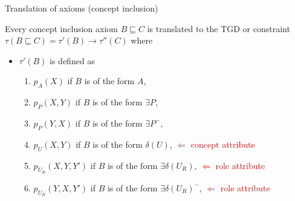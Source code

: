 \documentclass{beamer}
\begin{document}
 \begin{frame}{Translation of axioms (concept inclusion)}
 

 

 \tiny
 Every concept inclusion axiom $B \sqsubseteq C$ is translated to the TGD or constraint $\tau (B \sqsubseteq C) = \tau'(B) \rightarrow \tau''(C)$ where
 \begin{itemize}
  \tiny
 \item $ \tau'(B) $ is defined as
 \begin{enumerate}
  \tiny
 \item $ p_A (X)$ if $B$ is of the form $A$,
  \item $ p_P (X,Y)$ if $B$ is of the form $\exists P$,
    \item $ p_P (Y,X)$ if $B$ is of the form $\exists P^-$,
    \item $ p_U (X,Y)$ if $B$ is of the form $\delta (U)$,  \textcolor{red}{$\Leftarrow$ concept attribute}
    \item $p_{U_R}(X,Y,Y')$ if $B$ is of the form $\exists \delta (U_R)$,  \textcolor{red}{$\Leftarrow$ role attribute}
    \item $p_{U_R}(Y,X,Y')$ if $B$ is of the form $\exists \delta (U_R)^-$,       \textcolor{red}{$\Leftarrow$ role attribute}
 
 \end{enumerate}


\end{itemize}
\end{frame}
\end{document}
